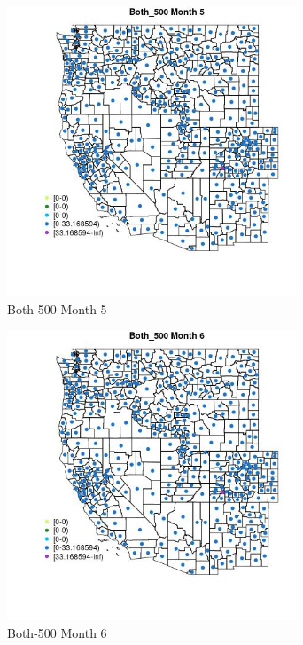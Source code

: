 \begin{figure} 
\centering  
\includegraphics[width=0.77\textwidth]{Code_Outputs/df_report_ML_predictors_CountyCentroid_Locations_Dates_2008-01-01to2018-12-31_MapObsMo5Both_500.jpg} 
\caption{\label{fig:df_report_ML_predictors_CountyCentroid_Locations_Dates_2008-01-01to2018-12-31MapObsMo5Both_500}Both-500 Month 5} 
\end{figure} 
 

\clearpage 

\begin{figure} 
\centering  
\includegraphics[width=0.77\textwidth]{Code_Outputs/df_report_ML_predictors_CountyCentroid_Locations_Dates_2008-01-01to2018-12-31_MapObsMo6Both_500.jpg} 
\caption{\label{fig:df_report_ML_predictors_CountyCentroid_Locations_Dates_2008-01-01to2018-12-31MapObsMo6Both_500}Both-500 Month 6} 
\end{figure} 
 

